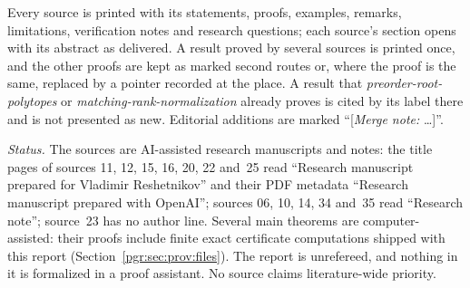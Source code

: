 \documentclass[11pt]{article}
\numberwithin{equation}{section}
\theoremstyle{definition}\newtheorem{definition}[theorem]{Definition}\newtheorem{remark}[theorem]{Remark}
\newcommand{\prp}{\emph{preorder-root-polytopes}}
\newcommand{\mrn}{\emph{matching-rank-normalization}}
\begin{document}
Every source is printed with its statements, proofs, examples, remarks,
limitations, verification notes and research questions; each source's
section opens with its abstract as delivered. A result proved by several
sources is printed once, and the other proofs are kept as marked second
routes or, where the proof is the same, replaced by a pointer recorded at
the place. A result that \prp{} or \mrn{} already proves is cited by its
label there and is not presented as new. Editorial additions are marked
``[\textit{Merge note:} \dots]''.

\emph{Status.} The sources are AI-assisted research manuscripts and notes:
the title pages of sources 11, 12, 15, 16, 20, 22 and~25 read ``Research
manuscript prepared for Vladimir Reshetnikov'' and their PDF metadata
``Research manuscript prepared with OpenAI''; sources 06, 10, 14, 34 and~35 read
``Research note''; source~23 has no author line. Several main theorems are
computer-assisted: their proofs include finite exact certificate
computations shipped with this report (Section~\ref{pgr:sec:prov:files}).
The report is unrefereed, and nothing in it is formalized in a proof
assistant. No source claims literature-wide priority.
\end{document}
